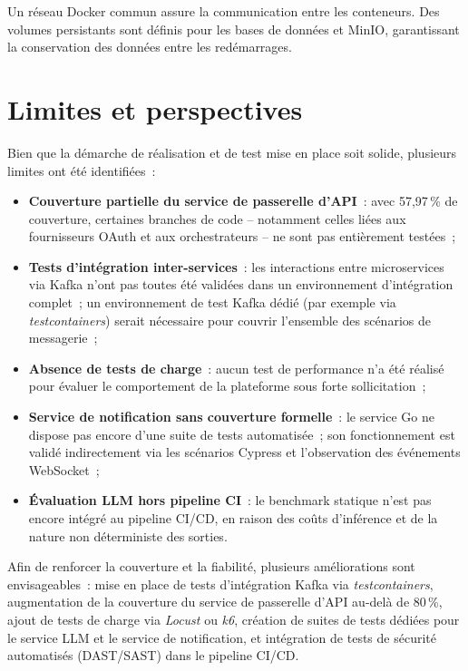 Un réseau Docker commun assure la communication entre les conteneurs. Des volumes persistants
sont définis pour les bases de données et MinIO, garantissant la conservation des données entre
les redémarrages.

\section{Limites et perspectives}
\label{sec:limites}

Bien que la démarche de réalisation et de test mise en place soit solide, plusieurs limites ont
été identifiées~:

\begin{itemize}
    \item \textbf{Couverture partielle du service de passerelle d'API}~: avec 57,97\,\% de
          couverture, certaines branches de code -- notamment celles liées aux fournisseurs OAuth
          et aux orchestrateurs -- ne sont pas entièrement testées~;
    \item \textbf{Tests d'intégration inter-services}~: les interactions entre microservices via
          Kafka n'ont pas toutes été validées dans un environnement d'intégration complet~; un
          environnement de test Kafka dédié (par exemple via \textit{testcontainers}) serait
          nécessaire pour couvrir l'ensemble des scénarios de messagerie~;
    \item \textbf{Absence de tests de charge}~: aucun test de performance n'a été réalisé pour
          évaluer le comportement de la plateforme sous forte sollicitation~;
    \item \textbf{Service de notification sans couverture formelle}~: le service Go ne dispose
          pas encore d'une suite de tests automatisée~; son fonctionnement est validé
          indirectement via les scénarios Cypress et l'observation des événements WebSocket~;
    \item \textbf{Évaluation LLM hors pipeline CI}~: le benchmark statique n'est pas encore
          intégré au pipeline CI/CD, en raison des coûts d'inférence et de la nature non
          déterministe des sorties.
\end{itemize}

Afin de renforcer la couverture et la fiabilité, plusieurs améliorations sont envisageables~:
mise en place de tests d'intégration Kafka via \textit{testcontainers}, augmentation de la
couverture du service de passerelle d'API au-delà de 80\,\%, ajout de tests de charge via
\textit{Locust} ou \textit{k6}, création de suites de tests dédiées pour le service LLM et le
service de notification, et intégration de tests de sécurité automatisés (DAST/SAST) dans le
pipeline CI/CD.

